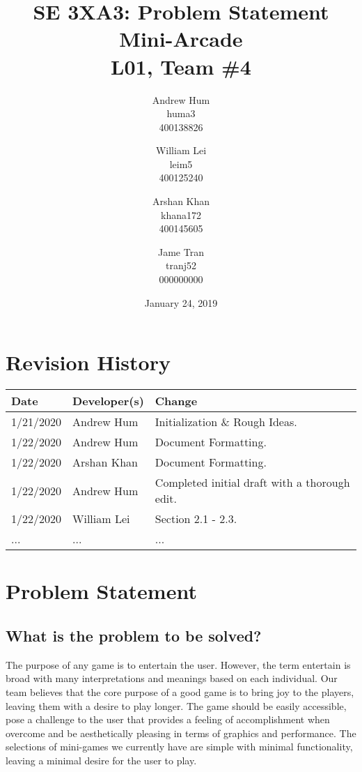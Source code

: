 \documentclass{article}
\title{SE 3XA3: Problem Statement \\ Mini-Arcade \\{\large L01, Team \#4}}
\author{Andrew Hum \\ huma3 \\ 400138826 \and
		William Lei \\ leim5 \\ 400125240 \and
		Arshan Khan \\ khana172 \\ 400145605 \and
		Jame Tran \\ tranj52 \\ 000000000
}
\date{January 24, 2019}
\begin{document}
\maketitle
\newpage

\tableofcontents
\newpage



\begin{table}[hp]
\section{Revision History} \label{TblRevisionHistory}
\begin{tabularx}{\textwidth}{llX}
\hline
\textbf{Date} & \textbf{Developer(s)} & \textbf{Change}\\
\hline
1/21/2020 & Andrew Hum & Initialization \& Rough Ideas.\\
\hline
1/22/2020 & Andrew Hum  & Document Formatting.\\
\hline
1/22/2020 & Arshan Khan & Document Formatting.\\
\hline
1/22/2020 & Andrew Hum & Completed initial draft with a thorough edit. \\
\hline
1/22/2020 & William Lei & Section 2.1 - 2.3.\\
\hline
... & ... & ...\\
\hline
\end{tabularx}
\end{table}

\newpage

\section{Problem Statement}
\subsection{What is the problem to be solved?}
The purpose of any game is to entertain the user. However, the term entertain is broad with many interpretations and meanings based on each individual. Our team believes that the core purpose of a good game is to bring joy to the players, leaving them with a desire to play longer. The game should be easily accessible, pose a challenge to the user that provides a feeling of accomplishment when overcome and be aesthetically pleasing in terms of graphics and performance. The selections of mini-games we currently have are simple with minimal functionality, leaving a minimal desire for the user to play.
\end{document}

